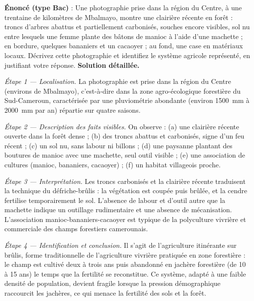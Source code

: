 \documentclass[11pt]{article}
\newcommand{\cle}[1]{{\popxbold\color{popdark}#1}}
\begin{document}
\begin{exoresolu}
\textbf{Énoncé (type Bac)} : Une photographie prise dans la région du Centre, à une trentaine de kilomètres de Mbalmayo, montre une clairière récente en forêt : troncs d'arbres abattus et partiellement carbonisés, souches encore visibles, sol nu entre lesquels une femme plante des bâtons de manioc à l'aide d'une machette ; en bordure, quelques bananiers et un cacaoyer ; au fond, une case en matériaux locaux. Décrivez cette photographie et identifiez le système agricole représenté, en justifiant votre réponse.
\tcblower
\textbf{Solution détaillée.}

\emph{Étape 1 — Localisation.} La photographie est prise dans la région du Centre (environs de Mbalmayo), c'est-à-dire dans la zone agro-écologique forestière du Sud-Cameroun, caractérisée par une pluviométrie abondante (environ \SI{1500}{\milli\meter} à \SI{2000}{\milli\meter} par an) répartie sur quatre saisons.

\emph{Étape 2 — Description des faits visibles.} On observe : (a) une clairière récente ouverte dans la forêt dense ; (b) des troncs abattus et carbonisés, signe d'un feu récent ; (c) un sol nu, sans labour ni billons ; (d) une paysanne plantant des boutures de manioc avec une machette, seul outil visible ; (e) une association de cultures (manioc, bananiers, cacaoyer) ; (f) un habitat villageois proche.

\emph{Étape 3 — Interprétation.} Les troncs carbonisés et la clairière récente traduisent la technique du \cle{défriche-brûlis} : la végétation est coupée puis brûlée, et la cendre fertilise temporairement le sol. L'absence de labour et d'outil autre que la machette indique un outillage rudimentaire et une absence de mécanisation. L'association manioc-bananiers-cacaoyer est typique de la \cle{polyculture} vivrière et commerciale des champs forestiers camerounais.

\emph{Étape 4 — Identification et conclusion.} Il s'agit de l'\cle{agriculture itinérante sur brûlis}, forme traditionnelle de l'agriculture vivrière pratiquée en zone forestière : le champ est cultivé deux à trois ans puis abandonné en jachère forestière (de 10 à 15 ans) le temps que la fertilité se reconstitue. Ce système, adapté à une faible densité de population, devient fragile lorsque la pression démographique raccourcit les jachères, ce qui menace la fertilité des sols et la forêt.
\end{exoresolu}
\end{document}

